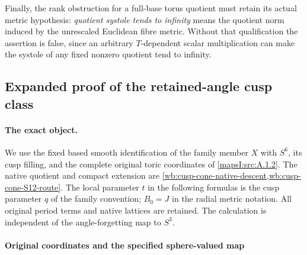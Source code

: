 Finally, the rank obstruction for a full-base torus quotient must retain
its actual metric hypothesis: \emph{quotient systole tends to infinity}
means the quotient norm induced by the unrescaled Euclidean fibre metric.
Without that qualification the assertion is false, since an arbitrary
\(T\)-dependent scalar multiplication can make the systole of any fixed
nonzero quotient tend to infinity.

\subsection{Expanded proof of the retained-angle cusp class}
\label{wb:h24:ret:section}

\paragraph{The exact object.}
We use the fixed based smooth identification of the family member $X$ with
$S^6$, its cusp filling, and the complete original toric coordinates of
\cref{mapsI:src:A.1.2}. The native quotient and compact extension are
\cref{wb:cusp-cone-native-descent,wb:cusp-cone-S12-route}.
The local parameter $t$ in the following formulas is the cusp parameter
$q$ of the family convention; $B_0=J$ in the radial metric notation.
All original period terms and native lattices are retained. The
calculation is independent of the angle-forgetting map to $S^3$.

\paragraph{Original coordinates and the specified sphere-valued map}

